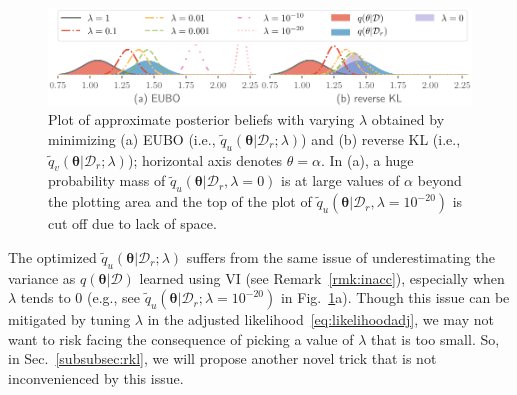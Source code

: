 \documentclass{article}
\theoremstyle{definition}
\newcommand{\todo}[1]{}
\newcommand{\mcl}[1]{\mathcal{#1}}
\newcommand{\da}{\mcl{D}}
\newcommand{\dc}{\mcl{D}_r}
\newcommand{\dr}{\mcl{D}_e}
\newcommand{\eubo}{\tilde{q}_u}
\newcommand{\elbo}{\tilde{q}_v}
\begin{document}
%
\begin{figure}
\centering
\includegraphics[width=\textwidth]{img/gamma_unknown_mean/gamma_unlearn.pdf}
\caption{Plot of approximate posterior beliefs with varying $\lambda$ obtained by minimizing (a) EUBO (i.e., $\eubo(\bm{\theta}|\dc;\lambda)$) and (b) reverse KL (i.e., $\elbo(\bm{\theta}|\dc;\lambda)$); horizontal axis denotes $\theta = \alpha$.
In (a), a huge probability
mass of $\eubo(\bm{\theta}|\dc, \lambda=0)$ is at large values of $\alpha$ beyond the plotting area and the top of the plot of $\eubo(\bm{\theta}|\dc, \lambda=10^{-20})$ is cut off due to lack of space.
}
\label{fig:expunlearn}
\end{figure}
\todo{need details about this example}
%
The optimized $\eubo(\bm{\theta}|\dc; \lambda)$
suffers from the same issue of underestimating the variance as $q(\bm{\theta}|\da)$ learned using VI (see Remark~\ref{rmk:inacc}), 
especially when $\lambda$ tends to $0$ (e.g., see $\eubo(\bm{\theta}|\dc; \lambda=10^{-20})$ in Fig.~\ref{fig:expunlearn}a).
Though this issue can be mitigated by tuning $\lambda$ in the adjusted likelihood~\eqref{eq:likelihoodadj}, we may not want to risk facing the consequence of picking a value of $\lambda$ that is too small.
So, in Sec.~\ref{subsubsec:rkl}, we will propose another novel trick that is not inconvenienced by this issue.
%
\end{document}
